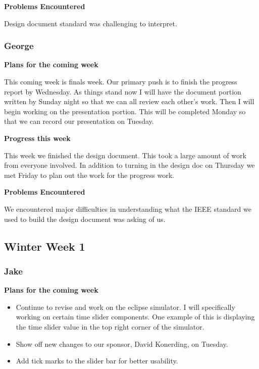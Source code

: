 \documentclass[10pt, onecolumn, draftclsnofoot, letterpaper, compsoc]{IEEEtran}
\begin{document}
    \noindent \textbf{Problems Encountered}

    Design document standard was challenging to interpret.

    \subsubsection{George}

    \noindent \textbf{Plans for the coming week}

    This coming week is finals week. Our primary push is to finish the progress
    report by Wednesday. As things stand now I will have the document portion written
    by Sunday night so that we can all review each other's work. Then I will begin working
    on the presentation portion. This will be completed Monday so that we can record
    our presentation on Tuesday.

    \noindent \textbf{Progress this week}

    This week we finished the design document. This took a large amount of work
    from everyone involved. In addition to turning in the design doc on Thursday
    we met Friday to plan out the work for the progress work.

    \noindent \textbf{Problems Encountered}

    We encountered major difficulties in understanding what the IEEE standard we
    used to build the design document was asking of us.

\subsection{Winter Week 1}

    \subsubsection{Jake}

    \noindent \textbf{Plans for the coming week}

    \begin{itemize}

    \item Continue to revise and work on the eclipse simulator. I will specifically
    working on certain time slider components. One example of this is displaying
    the time slider value in the top right corner of the simulator.
    \item Show off new changes to our sponsor, David Konerding, on Tuesday.
    \item Add tick marks to the slider bar for better usability.

    \end{itemize}
\end{document}
